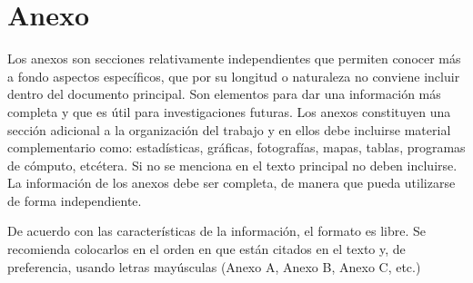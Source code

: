 \anexo{}


\chapter{Anexo} \label{chap:anexA}
Los anexos son secciones relativamente independientes que permiten conocer más a fondo aspectos específicos, que por su longitud o naturaleza no conviene incluir dentro del documento principal. Son elementos para dar una información más completa y que es útil para investigaciones futuras. Los anexos constituyen una sección adicional a la organización del trabajo y en ellos debe incluirse material complementario como: estadísticas, gráficas, fotografías, mapas, tablas, programas de cómputo, etcétera. Si no se menciona en el texto principal no deben incluirse. La información de los anexos debe ser completa, de manera que pueda utilizarse de forma independiente.

De acuerdo con las características de la información, el formato es libre. Se recomienda colocarlos en el orden en que están citados en el texto y, de preferencia, usando letras mayúsculas (Anexo A, Anexo B, Anexo C, etc.) 
